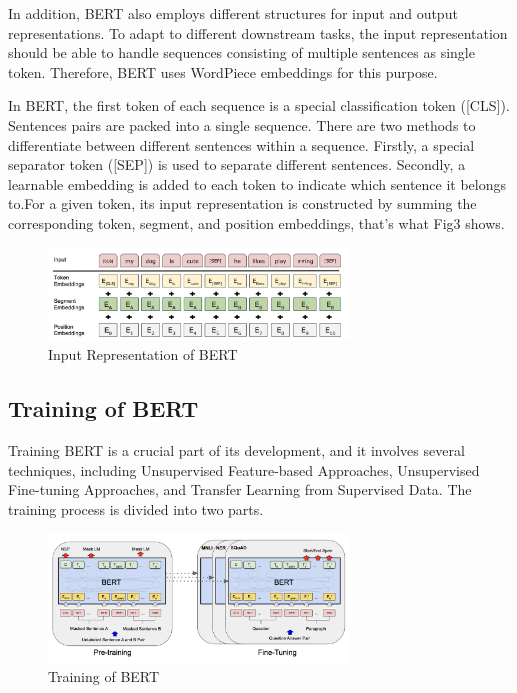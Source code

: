 \documentclass[conference]{IEEEtran}
\begin{document}
\par In addition, BERT also employs different structures for input and output 
representations. To adapt to different downstream tasks, the input representation 
should be able to handle sequences consisting of multiple sentences as single token. 
Therefore, BERT uses WordPiece embeddings for this purpose.

\par In BERT, the first token of each sequence is a special classification token ([CLS]). 
Sentences pairs are packed into a single sequence. There are two methods to differentiate 
between different sentences within a sequence. Firstly, a special separator token ([SEP]) 
is used to separate different sentences. Secondly, a learnable embedding is added to each 
token to indicate which sentence it belongs to.For a given token, its input representation 
is constructed by summing the corresponding token, segment, and position embeddings, that's 
what Fig3 shows.

\begin{figure}[htbp]
    \centerline{\includegraphics[width = 8cm]{pic/fig3.png}}
    \caption{Input Representation of BERT}
    \label{fig}
\end{figure}


\subsection{Training of BERT}

\par Training BERT is a crucial part of its development, and it involves several 
techniques, including Unsupervised Feature-based Approaches, Unsupervised 
Fine-tuning Approaches, and Transfer Learning from Supervised Data. The training 
process is divided into two parts. 

\begin{figure}[htbp]
    \centerline{\includegraphics[width = 8cm]{pic/fig4.png}}
    \caption{Training of BERT}
    \label{fig}
\end{figure}
\end{document}
